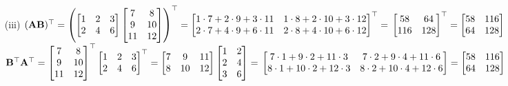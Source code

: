 \documentclass[11pt,letterpaper]{article}
\begin{document}
\begin{enumerate}
\begin{enumerate}
\begin{enumerate}
\item [(iii)] $(\mathbf{A}\mathbf{B})^\top = \left(\begin{bmatrix} 1 & 2 & 3 \\ 2 & 4 & 6 \end{bmatrix} \begin{bmatrix} 7 & 8 \\ 9 & 10 \\ 11 & 12 \end{bmatrix}\right)^\top = \begin{bmatrix} 1 \cdot 7 + 2 \cdot 9 + 3 \cdot 11 & 1 \cdot 8 + 2 \cdot 10 + 3 \cdot 12 \\ 2 \cdot 7 + 4 \cdot 9 + 6 \cdot 11 & 2 \cdot 8 + 4 \cdot 10 + 6 \cdot 12 \end{bmatrix}^\top = \\\begin{bmatrix} 58 & 64 \\ 116 & 128 \end{bmatrix}^\top = \begin{bmatrix} 58 & 116 \\ 64 & 128 \end{bmatrix}$\\
              $\mathbf{B}^\top \mathbf{A}^\top = \begin{bmatrix} 7 & 8 \\ 9 & 10 \\ 11 & 12 \end{bmatrix}^\top \begin{bmatrix} 1 & 2 & 3 \\ 2 & 4 & 6 \end{bmatrix}^\top = \begin{bmatrix} 7 & 9 & 11 \\ 8 & 10 & 12 \end{bmatrix} \begin{bmatrix} 1 & 2 \\ 2 & 4 \\ 3 & 6 \end{bmatrix} = \\\begin{bmatrix} 7 \cdot 1 + 9 \cdot 2 + 11 \cdot 3 & 7 \cdot 2 + 9 \cdot 4 + 11 \cdot 6 \\ 8 \cdot 1 + 10 \cdot 2 + 12 \cdot 3 & 8 \cdot 2 + 10 \cdot 4 + 12 \cdot 6 \end{bmatrix} = \begin{bmatrix} 58 & 116 \\ 64 & 128 \end{bmatrix}$\\

\end{enumerate}
\end{enumerate}
\end{enumerate}
\end{document}
